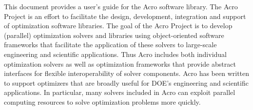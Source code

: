 This document provides a user's guide for the Acro software library.
The Acro Project is an effort to facilitate the design, development,
integration and support of optimization software libraries.  The goal
of the Acro Project is to develop (parallel) optimization solvers and
libraries using object-oriented software frameworks that facilitate the
application of these solvers to large-scale engineering and scientific
applications.  Thus Acro includes both individual optimization solvers
as well as optimization frameworks that provide abstract interfaces for
flexible interoperability of solver components.  Acro has been written
to support optimizers that are broadly useful for DOE's engineering and
scientific applications.  In particular, many solvers included in Acro
can exploit parallel computing resources to solve optimization problems
more quickly.
